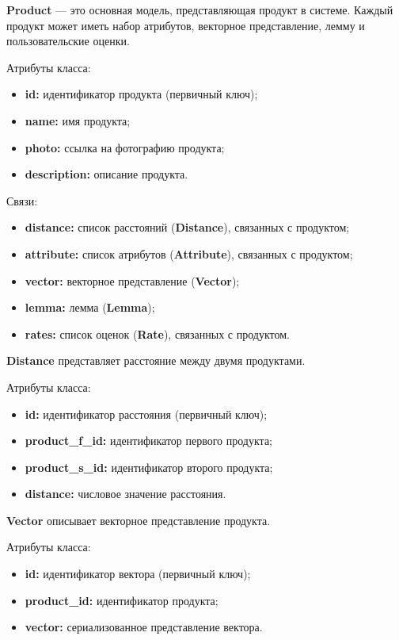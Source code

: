 \textbf{Product} — это основная модель, представляющая продукт в системе. Каждый продукт может иметь набор атрибутов, векторное представление, лемму и пользовательские оценки.

Атрибуты класса:
\begin{itemize}
	\item \textbf{id:} идентификатор продукта (первичный ключ);
	\item \textbf{name:} имя продукта;
	\item \textbf{photo:} ссылка на фотографию продукта;
	\item \textbf{description:} описание продукта.
\end{itemize}

Связи:
\begin{itemize}
	\item \textbf{distance:} список расстояний (\textbf{Distance}), связанных с продуктом;
	\item \textbf{attribute:} список атрибутов (\textbf{Attribute}), связанных с продуктом;
	\item \textbf{vector:} векторное представление (\textbf{Vector});
	\item \textbf{lemma:} лемма (\textbf{Lemma});
	\item \textbf{rates:} список оценок (\textbf{Rate}), связанных с продуктом.
\end{itemize}

\textbf{Distance} представляет расстояние между двумя продуктами.

Атрибуты класса:
\begin{itemize}
	\item \textbf{id:} идентификатор расстояния (первичный ключ);
	\item \textbf{product\_f\_id:} идентификатор первого продукта;
	\item \textbf{product\_s\_id:} идентификатор второго продукта;
	\item \textbf{distance:} числовое значение расстояния.
\end{itemize}

\textbf{Vector} описывает векторное представление продукта.

Атрибуты класса:
\begin{itemize}
	\item \textbf{id:} идентификатор вектора (первичный ключ);
	\item \textbf{product\_id:} идентификатор продукта;
	\item \textbf{vector:} сериализованное представление вектора.
\end{itemize}

